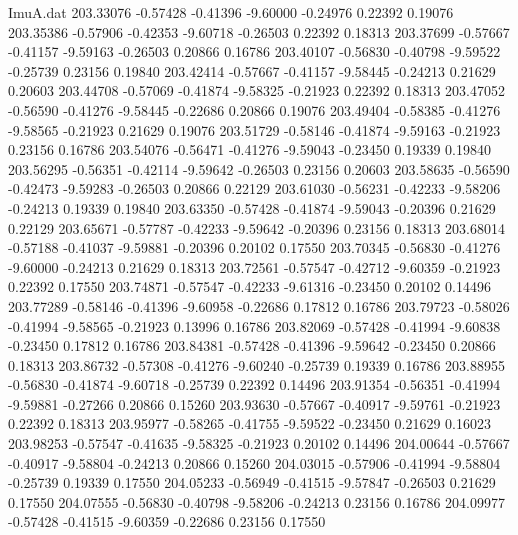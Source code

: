\begin{filecontents}{ImuA.dat}
 203.33076   -0.57428   -0.41396   -9.60000   -0.24976    0.22392    0.19076
 203.35386   -0.57906   -0.42353   -9.60718   -0.26503    0.22392    0.18313
 203.37699   -0.57667   -0.41157   -9.59163   -0.26503    0.20866    0.16786
 203.40107   -0.56830   -0.40798   -9.59522   -0.25739    0.23156    0.19840
 203.42414   -0.57667   -0.41157   -9.58445   -0.24213    0.21629    0.20603
 203.44708   -0.57069   -0.41874   -9.58325   -0.21923    0.22392    0.18313
 203.47052   -0.56590   -0.41276   -9.58445   -0.22686    0.20866    0.19076
 203.49404   -0.58385   -0.41276   -9.58565   -0.21923    0.21629    0.19076
 203.51729   -0.58146   -0.41874   -9.59163   -0.21923    0.23156    0.16786
 203.54076   -0.56471   -0.41276   -9.59043   -0.23450    0.19339    0.19840
 203.56295   -0.56351   -0.42114   -9.59642   -0.26503    0.23156    0.20603
 203.58635   -0.56590   -0.42473   -9.59283   -0.26503    0.20866    0.22129
 203.61030   -0.56231   -0.42233   -9.58206   -0.24213    0.19339    0.19840
 203.63350   -0.57428   -0.41874   -9.59043   -0.20396    0.21629    0.22129
 203.65671   -0.57787   -0.42233   -9.59642   -0.20396    0.23156    0.18313
 203.68014   -0.57188   -0.41037   -9.59881   -0.20396    0.20102    0.17550
 203.70345   -0.56830   -0.41276   -9.60000   -0.24213    0.21629    0.18313
 203.72561   -0.57547   -0.42712   -9.60359   -0.21923    0.22392    0.17550
 203.74871   -0.57547   -0.42233   -9.61316   -0.23450    0.20102    0.14496
 203.77289   -0.58146   -0.41396   -9.60958   -0.22686    0.17812    0.16786
 203.79723   -0.58026   -0.41994   -9.58565   -0.21923    0.13996    0.16786
 203.82069   -0.57428   -0.41994   -9.60838   -0.23450    0.17812    0.16786
 203.84381   -0.57428   -0.41396   -9.59642   -0.23450    0.20866    0.18313
 203.86732   -0.57308   -0.41276   -9.60240   -0.25739    0.19339    0.16786
 203.88955   -0.56830   -0.41874   -9.60718   -0.25739    0.22392    0.14496
 203.91354   -0.56351   -0.41994   -9.59881   -0.27266    0.20866    0.15260
 203.93630   -0.57667   -0.40917   -9.59761   -0.21923    0.22392    0.18313
 203.95977   -0.58265   -0.41755   -9.59522   -0.23450    0.21629    0.16023
 203.98253   -0.57547   -0.41635   -9.58325   -0.21923    0.20102    0.14496
 204.00644   -0.57667   -0.40917   -9.58804   -0.24213    0.20866    0.15260
 204.03015   -0.57906   -0.41994   -9.58804   -0.25739    0.19339    0.17550
 204.05233   -0.56949   -0.41515   -9.57847   -0.26503    0.21629    0.17550
 204.07555   -0.56830   -0.40798   -9.58206   -0.24213    0.23156    0.16786
 204.09977   -0.57428   -0.41515   -9.60359   -0.22686    0.23156    0.17550

\end{filecontents}
